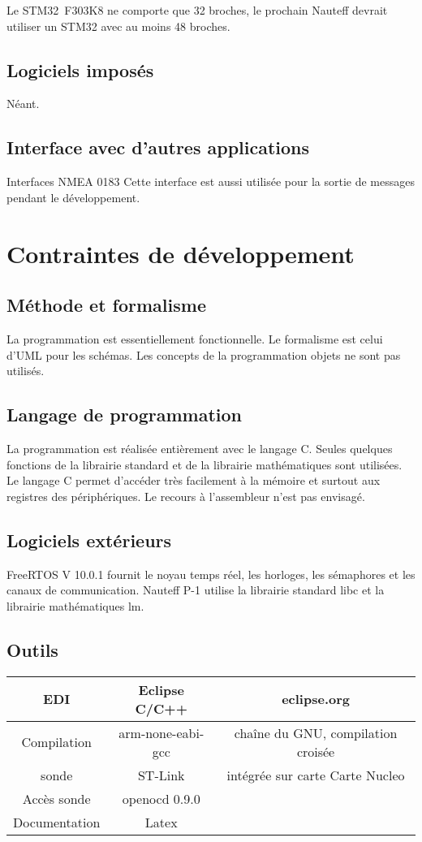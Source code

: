 \documentclass[a4paper,11pt]{report}
\begin{document}
Le STM32~F303K8 ne comporte que 32 broches, le prochain Nauteff
devrait utiliser un STM32 avec au moins 48 broches.
\subsection{Logiciels imposés}
Néant.
\subsection{Interface avec d'autres applications}
Interfaces NMEA 0183
Cette interface est aussi utilisée pour la sortie de messages
pendant le développement.
\section{Contraintes de développement}
\subsection{Méthode et formalisme}
La programmation est essentiellement fonctionnelle.
Le formalisme est celui d'UML pour les schémas.
Les concepts de la programmation objets ne sont pas utilisés.

\subsection{Langage de programmation}
La programmation est réalisée entièrement avec le langage C.
Seules quelques fonctions de la librairie standard et de la librairie
mathématiques sont utilisées. Le langage C permet d'accéder très facilement
à la mémoire et surtout aux registres des périphériques.
Le recours à l'assembleur n'est pas envisagé.
\subsection{Logiciels extérieurs}
FreeRTOS V 10.0.1 fournit le noyau temps réel, les horloges,
les sémaphores et les canaux de communication.
Nauteff P-1 utilise la librairie standard libc et la librairie mathématiques lm. 
\subsection{Outils}

\begin{tabular}{|c|c|c|}
	\hline 
	EDI& Eclipse C/C++ & eclipse.org    \\ 
	\hline 
	Compilation & arm-none-eabi-gcc & chaîne du GNU, compilation croisée \\ 
	\hline 
	sonde & ST-Link & intégrée sur carte Carte Nucleo   \\ 
	\hline 
	Accès sonde & openocd 0.9.0 &   \\ 
	\hline 
	Documentation & Latex &  \\ 
	\hline 
\end{tabular}
\end{document}
